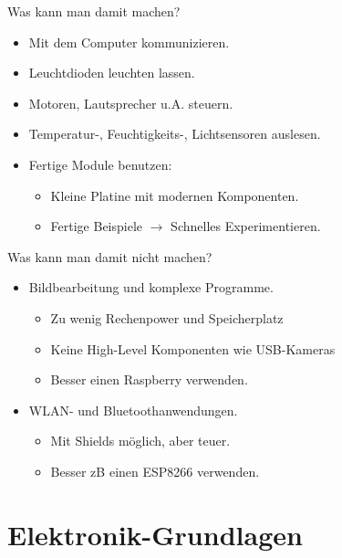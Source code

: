 \documentclass[12pt]{beamer}
\begin{document}
\begin{frame}{Was kann man damit machen?}
\begin{itemize}
\item Mit dem Computer kommunizieren.
\item Leuchtdioden leuchten lassen.
\item Motoren, Lautsprecher u.A. steuern.
\item Temperatur-, Feuchtigkeits-, Lichtsensoren auslesen.
\item Fertige Module benutzen:
\begin{itemize}
  \item Kleine Platine mit modernen Komponenten.
  \item Fertige Beispiele $\rightarrow$ Schnelles Experimentieren.
\end{itemize}
\end{itemize}
\end{frame}

\begin{frame}{Was kann man damit nicht machen?}
\begin{itemize}
\item  Bildbearbeitung und komplexe Programme.
\begin{itemize}
  \item Zu wenig Rechenpower und Speicherplatz
  \item Keine High-Level Komponenten wie USB-Kameras
  \item Besser einen Raspberry verwenden.
\end{itemize}
\item  WLAN- und Bluetoothanwendungen.
\begin{itemize}
  \item Mit Shields möglich, aber teuer.
  \item Besser zB einen ESP8266 verwenden.
\end{itemize}
\end{itemize}
\end{frame}


\section{Elektronik-Grundlagen}
\end{document}
